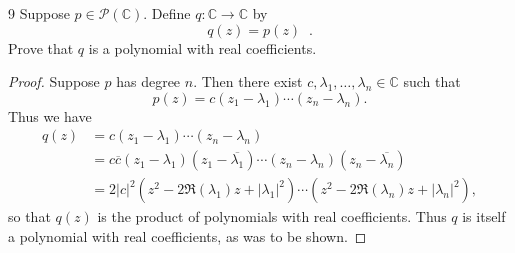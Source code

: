 \documentclass{extarticle}
\newenvironment{problem}[1]{\begin{prob*}{#1}{}}{\end{prob*}}
\newcommand{\C}{\mathbb{C}}
\newcommand{\poly}{\mathcal{P}}
\newcommand\widebar[1]{\mathop{\overline{#1}}}
\begin{document}
\begin{problem}{9}
Suppose $p\in\poly(\C)$.  Define $q:\C\to\C$ by
\begin{equation*}
q(z) = p(z)\widebar{p(\overline{z})}.
\end{equation*}
Prove that $q$ is a polynomial with real coefficients.
\end{problem}
\begin{proof}
Suppose $p$ has degree $n$.  Then there exist $c,\lambda_1,\dots,\lambda_n\in\C$ such that 
\begin{equation*}
p(z) = c(z_1 - \lambda_1)\cdots(z_n-\lambda_n).
\end{equation*}
Thus we have
\begin{align*}
q(z) &= c(z_1 - \lambda_1)\cdots(z_n-\lambda_n)\widebar{c\left(\overline{z_1} - \lambda_1\right)\cdots\left(\overline{z_n}-\lambda_n\right)}\\
&= c\overline{c}(z_1 - \lambda_1)\left(z_1 - \overline{\lambda_1}\right)\cdots(z_n-\lambda_n)\left(z_n - \overline{\lambda_n}\right)\\
&= 2|c|^2\left(z^2 -2\Re(\lambda_1)z + |\lambda_1|^2\right)\cdots\left(z^2 -2\Re(\lambda_n)z + |\lambda_n|^2\right),
\end{align*}
so that $q(z)$ is the product of polynomials with real coefficients.  Thus $q$ is itself a polynomial with real coefficients, as was to be shown.
\end{proof}
\end{document}
